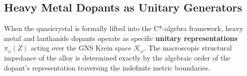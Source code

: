 \subsection{Heavy Metal Dopants as Unitary Generators}
\label{sec:heavy-metal-generators}

\begin{theorem}
\label{thm:heavy-metal-generators}
When the quasicrystal is formally lifted into the C*-algebra framework, heavy metal and lanthanide dopants operate as specific \textbf{unitary representations} $\pi_\omega(Z)$ acting over the GNS Krein space $\mathcal{K}_\omega$. The macroscopic structural impedance of the alloy is determined exactly by the algebraic order of the dopant's representation traversing the indefinite metric boundaries.
\end{theorem}

